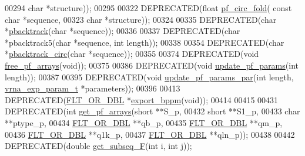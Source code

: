 \begin{DoxyCode}
00294                 \textcolor{keywordtype}{char} *structure));
00295 
00322 DEPRECATED(\textcolor{keywordtype}{float}   \hyperlink{group__pf__fold_ga819ce5fca8984004ac81c4a3b04cb735}{pf\_circ\_fold}( \textcolor{keyword}{const} \textcolor{keywordtype}{char} *sequence,
00323                       \textcolor{keywordtype}{char} *structure));
00324 
00335 DEPRECATED(\textcolor{keywordtype}{char}    *\hyperlink{group__subopt__stochbt_gac03ca6db186bb3bf0a2a326d7fb3ba03}{pbacktrack}(\textcolor{keywordtype}{char} *sequence));
00336 
00337 DEPRECATED(\textcolor{keywordtype}{char}    *pbacktrack5(\textcolor{keywordtype}{char} *sequence, \textcolor{keywordtype}{int} length));
00338 
00354 DEPRECATED(\textcolor{keywordtype}{char}    *\hyperlink{group__subopt__stochbt_ga00474051204ac9ad576b3e45174d03ff}{pbacktrack\_circ}(\textcolor{keywordtype}{char} *sequence));
00355 
00374 DEPRECATED(\textcolor{keywordtype}{void}  \hyperlink{group__pf__fold_gae73db3f49a94f0f72e067ecd12681dbd}{free\_pf\_arrays}(\textcolor{keywordtype}{void}));
00375 
00386 DEPRECATED(\textcolor{keywordtype}{void}  \hyperlink{group__pf__fold_ga384e927890f9c034ff09fa66da102d28}{update\_pf\_params}(\textcolor{keywordtype}{int} length));
00387 
00395 DEPRECATED(\textcolor{keywordtype}{void} \hyperlink{group__pf__fold_gaafe2d1b21f5418b123b088aa395e827d}{update\_pf\_params\_par}(\textcolor{keywordtype}{int} length, 
      \hyperlink{group__energy__parameters_structvrna__exp__param__s}{vrna\_exp\_param\_t} *parameters));
00396 
00413 DEPRECATED(\hyperlink{group__data__structures_ga31125aeace516926bf7f251f759b6126}{FLT\_OR\_DBL}  *\hyperlink{group__pf__fold_gac5ac7ee281aae1c5cc5898a841178073}{export\_bppm}(\textcolor{keywordtype}{void}));
00414 
00415 
00431 DEPRECATED(\textcolor{keywordtype}{int} \hyperlink{group__pf__fold_ga42faebdfce6f070c5f89adfc8427525c}{get\_pf\_arrays}(\textcolor{keywordtype}{short} **S\_p,
00432                   \textcolor{keywordtype}{short} **S1\_p,
00433                   \textcolor{keywordtype}{char} **ptype\_p,
00434                   \hyperlink{group__data__structures_ga31125aeace516926bf7f251f759b6126}{FLT\_OR\_DBL} **qb\_p,
00435                   \hyperlink{group__data__structures_ga31125aeace516926bf7f251f759b6126}{FLT\_OR\_DBL} **qm\_p,
00436                   \hyperlink{group__data__structures_ga31125aeace516926bf7f251f759b6126}{FLT\_OR\_DBL} **q1k\_p,
00437                   \hyperlink{group__data__structures_ga31125aeace516926bf7f251f759b6126}{FLT\_OR\_DBL} **qln\_p));
00438 
00442 DEPRECATED(\textcolor{keywordtype}{double} \hyperlink{part__func_8h_a189e2a1ec6cc32c53ea72f7543b0441e}{get\_subseq\_F}(\textcolor{keywordtype}{int} i, \textcolor{keywordtype}{int} j));

\end{DoxyCode}
